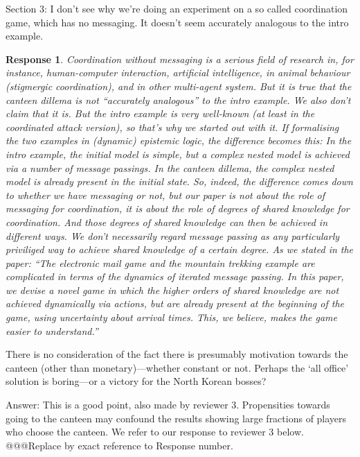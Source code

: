 \documentclass[a4paper]{article}
\newtheorem{response}{Response}
\newenvironment{robin}{\smallskip \noindent \color{red!10!green!50!blue}}{\color{black}\smallskip}
\begin{document}
Section 3: I don't see why we're doing an experiment on a so called coordination game, which has no messaging. It doesn't seem accurately analogous to the intro example. 

\begin{response}
Coordination without messaging is a serious field of research in, for instance, human-computer interaction, artificial intelligence, in animal behaviour (stigmergic coordination), and in other multi-agent system. But it is true that the canteen dillema is not ``accurately analogous'' to the intro example. We also don't claim that it is. But the intro example is very well-known (at least in the coordinated attack version), so that's why we started out with it. If formalising the two examples in (dynamic) epistemic logic, the difference becomes this: In the intro example, the initial model is simple, but a complex nested model is achieved via a number of message passings. In the canteen dillema, the complex nested model is already present in the initial state. So, indeed, the difference comes down to whether we have messaging or not, but our paper is not about the role of messaging for coordination, it is about the role of degrees of shared knowledge for coordination. And those degrees of shared knowledge can then be achieved in different ways. We don't necessarily regard message passing as any particularly priviliged way to achieve shared knowledge of a certain degree. As we stated in the paper: ``The electronic mail game and the mountain trekking example are complicated in terms of the dynamics of iterated message passing. In this paper, we devise a novel game in which the higher orders of shared knowledge are not achieved dynamically via actions, but are already present at the beginning of the game, using uncertainty about arrival times. This, we believe, makes the game easier to understand.'' 
\end{response}


There is no consideration of the fact there is presumably motivation towards the canteen (other than monetary)—whether constant or not. Perhaps the `all office' solution is boring—or a victory for the North Korean bosses? 

\begin{robin} Answer: This is a good point, also made by reviewer 3. Propensities towards going to the canteen may confound the results showing large fractions of players who choose the canteen. We refer to our response to reviewer 3 below. @@@Replace by exact reference to Response number.
\end{robin}
\end{document}
